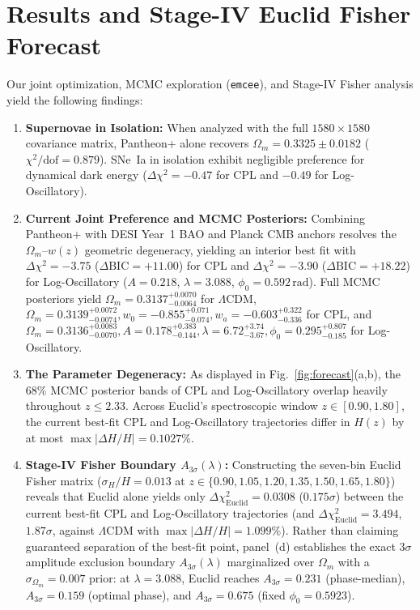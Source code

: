 \section{Results and Stage-IV Euclid Fisher Forecast}
Our joint optimization, MCMC exploration (\texttt{emcee}), and Stage-IV Fisher analysis yield the following findings:
\begin{enumerate}
    \item \textbf{Supernovae in Isolation:} When analyzed with the full $1580 \times 1580$ covariance matrix, Pantheon+ alone recovers $\Omega_m = 0.3325 \pm 0.0182$ ($\chi^2/\mathrm{dof} = 0.879$). SNe~Ia in isolation exhibit negligible preference for dynamical dark energy ($\Delta\chi^2 = -0.47$ for CPL and $-0.49$ for Log-Oscillatory).
    \item \textbf{Current Joint Preference and MCMC Posteriors:} Combining Pantheon+ with DESI Year~1 BAO and Planck CMB anchors resolves the $\Omega_m$--$w(z)$ geometric degeneracy, yielding an interior best fit with $\Delta\chi^2 = -3.75$ ($\Delta\mathrm{BIC} = +11.00$) for CPL and $\Delta\chi^2 = -3.90$ ($\Delta\mathrm{BIC} = +18.22$) for Log-Oscillatory ($A = 0.218$, $\lambda = 3.088$, $\phi_0 = 0.592\,\mathrm{rad}$). Full MCMC posteriors yield $\Omega_m = 0.3137^{+0.0070}_{-0.0064}$ for $\Lambda$CDM, $\Omega_m = 0.3139^{+0.0072}_{-0.0074}, w_0 = -0.855^{+0.071}_{-0.074}, w_a = -0.603^{+0.322}_{-0.336}$ for CPL, and $\Omega_m = 0.3136^{+0.0083}_{-0.0070}, A = 0.178^{+0.383}_{-0.144}, \lambda = 6.72^{+3.74}_{-3.67}, \phi_0 = 0.295^{+0.807}_{-0.185}$ for Log-Oscillatory.
    \item \textbf{The Parameter Degeneracy:} As displayed in Fig.~\ref{fig:forecast}(a,b), the $68\%$ MCMC posterior bands of CPL and Log-Oscillatory overlap heavily throughout $z \le 2.33$. Across Euclid's spectroscopic window $z \in [0.90, 1.80]$, the current best-fit CPL and Log-Oscillatory trajectories differ in $H(z)$ by at most $\max|\Delta H/H| = 0.1027\%$.
    \item \textbf{Stage-IV Fisher Boundary $A_{3\sigma}(\lambda)$:} Constructing the seven-bin Euclid Fisher matrix ($\sigma_H/H = 0.013$ at $z \in \{0.90, 1.05, 1.20, 1.35, 1.50, 1.65, 1.80\}$) reveals that Euclid alone yields only $\Delta\chi^2_{\mathrm{Euclid}} = 0.0308$ ($0.175\sigma$) between the current best-fit CPL and Log-Oscillatory trajectories (and $\Delta\chi^2_{\mathrm{Euclid}} = 3.494$, $1.87\sigma$, against $\Lambda$CDM with $\max|\Delta H/H| = 1.099\%$). Rather than claiming guaranteed separation of the best-fit point, panel~(d) establishes the exact $3\sigma$ amplitude exclusion boundary $A_{3\sigma}(\lambda)$ marginalized over $\Omega_m$ with a $\sigma_{\Omega_m} = 0.007$ prior: at $\lambda = 3.088$, Euclid reaches $A_{3\sigma} = 0.231$ (phase-median), $A_{3\sigma} = 0.159$ (optimal phase), and $A_{3\sigma} = 0.675$ (fixed $\phi_0 = 0.5923$).
\end{enumerate}

